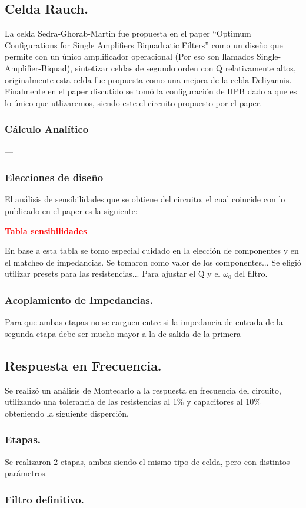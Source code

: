 \subsection{Celda Rauch.}
La celda Sedra-Ghorab-Martin fue propuesta en el paper ``Optimum Configurations for Single Amplifiers Biquadratic Filters'' como un diseño que permite con un único amplificador operacional (Por eso son llamados Single-Amplifier-Biquad), sintetizar celdas de segundo orden con Q relativamente altos, originalmente esta celda fue propuesta como una mejora de la celda Deliyannis.
Finalmente en el paper discutido se tomó la configuración de HPB dado a que es lo único que utlizaremos, siendo este el circuito propuesto por el paper.

\subsubsection{Cálculo Analítico}
---
\subsubsection{Elecciones de diseño}
El análisis de sensibilidades que se obtiene del circuito, el cual coincide con lo publicado en el paper es la siguiente: 
\begin{center}
	\huge{\textcolor{red}{\textbf{Tabla sensibilidades}}}
\end{center}
En base a esta tabla se tomo especial cuidado en la elección de componentes y en el matcheo de impedancias.
Se tomaron como valor de los componentes...
Se eligió utilizar presets para las resistencias... Para ajustar el Q y el $\omega_0$ del filtro.
\subsubsection{Acoplamiento de Impedancias.}
Para que ambas etapas no se carguen entre si la impedancia de entrada de la segunda etapa debe ser mucho mayor a la de salida de la primera
\subsection{Respuesta en Frecuencia.}
Se realizó un análisis de Montecarlo a la respuesta en frecuencia del circuito, utilizando una tolerancia de las resistencias al 1$\%$ y capacitores al 10$\%$ obteniendo la siguiente disperción,
\subsubsection{Etapas.}
Se realizaron 2 etapas, ambas siendo el mismo tipo de celda, pero con distintos parámetros.
\subsubsection{Filtro definitivo.}
%

